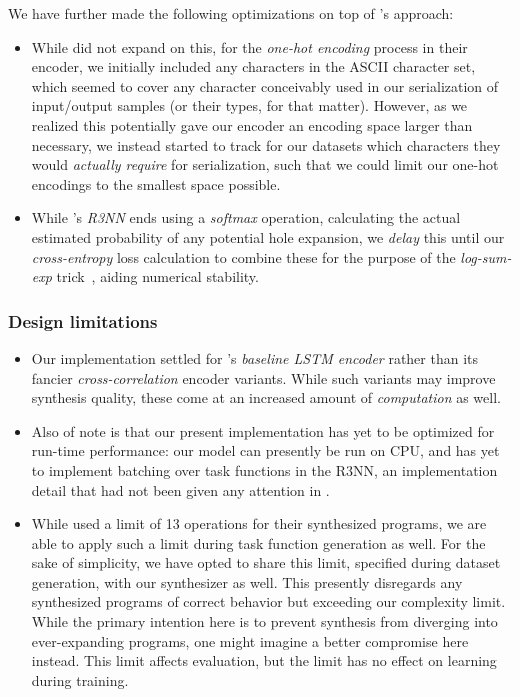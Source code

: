 \documentclass{article}
\begin{document}
We have further made the following optimizations on top of \citet{nsps}'s approach:
\begin{itemize}
    \item While \citet{nsps} did not expand on this,
    for the \emph{one-hot encoding} process in their encoder,
    we initially included any characters in the ASCII character set,
    which seemed to cover any character conceivably used in our serialization of input/output samples (or their types, for that matter).
    However, as we realized this potentially gave our encoder an encoding space larger than necessary,
    we instead started to track for our datasets which characters they would \emph{actually require} for serialization,
    such that we could limit our one-hot encodings to the smallest space possible.
    \item While \citet{nsps}'s \emph{R3NN} ends using a \emph{softmax} operation,
    calculating the actual estimated probability of any potential hole expansion,
    we \emph{delay} this until our \emph{cross-entropy} loss calculation to combine these for the purpose of the \emph{log-sum-exp} trick~\citep{eisele2016log},
    aiding numerical stability.
\end{itemize}

\subsubsection{Design limitations}

\begin{itemize}
    \item Our implementation settled for \citet{nsps}'s \emph{baseline LSTM encoder} rather than its fancier \emph{cross-correlation} encoder variants.
    While such variants may improve synthesis quality,
    these come at an increased amount of \emph{computation} as well.
    \item Also of note is that our present implementation has yet to be optimized for run-time performance:
    our model can presently be run on CPU,
    and has yet to implement batching over task functions in the R3NN,
    an implementation detail that had not been given any attention in \citet{nsps}.
    \item While \citet{nsps} used a limit of 13 operations for their synthesized programs,
    we are able to apply such a limit during task function generation as well.
    For the sake of simplicity, we have opted to share this limit,
    specified during dataset generation,
    with our synthesizer as well.
    This presently disregards any synthesized programs of
    correct behavior but exceeding our complexity limit.
    While the primary intention here is to prevent synthesis
    from diverging into ever-expanding programs,
    one might imagine a better compromise here instead.
    This limit affects evaluation,
    but the limit has no effect on learning during training.
\end{itemize}
\end{document}
